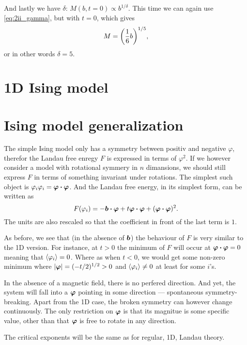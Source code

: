 \documentclass[11pt,letter, swedish, english
]{article}
\begin{document}
And lastly we have $\delta$: $M(b,t=0)\propto b^{1/\delta}$. This time
we can again use \eqref{eq:2ii_gamma}, but with $t=0$, which gives
\begin{equation}
M=\qty(\frac{1}{6}b)^{1/5},
\end{equation}
or in other words $\delta=5$.



\section{1D Ising model}



\section{Ising model generalization}
The simple Ising model only has a symmetry between positiv and
negative $\varphi$, therefor the Landau free enregy $F$ is expressed in
terms of $\varphi^2$. If we however consider a model with rotational
symmery in $n$ dimansions, we should still express $F$ in terms of
something invariant under rotations. The simplest such object is
$\varphi_i\varphi_i=\vb*{\varphi}\vdot\vb*{\varphi}$. And the Landau
free energy, in its simplest form, can be written as
\begin{equation}
F(\varphi_i)=-\vb*{b}\vdot\vb*{\varphi}+t\vb*{\varphi}\vdot\vb*{\varphi}
+(\vb*{\varphi}\vdot\vb*{\varphi})^2.
\end{equation}
The units are also rescaled so that the coefficient in front of the
last term is $1$. 

As before, we see that (in the absence of $\vb*{b}$) the behaviour of
$F$ is very similar to the 1D version. For instance, at $t>0$ the
minimum of $F$ will occur at $\vb*{\varphi}\vdot\vb*{\varphi}=0$
meaning that $\ev{\varphi_i}=0$. Where as when $t<0$, we would get
some non-zero minimum where $|\vb*\varphi|=(-t/2)^{1/2}>0$ and
$\ev{\varphi_i}\neq0$ at least for some $i$'s. 

In the absence of a magnetic field, there is no perfered
direction. And yet, the system will fall into a $\vb*\varphi$ pointing
in some direction --- spontaneous symmetry-breaking. Apart from the 1D
case, the broken symmetry can however change continuously. The only
restriction on $\vb*\varphi$ is that its magnitue is some specific
value, other than that $\vb*\varphi$ is free to rotate in any
direction.

The critical exponents will be the same as for regular, 1D, Landau
theory. 
\end{document}
